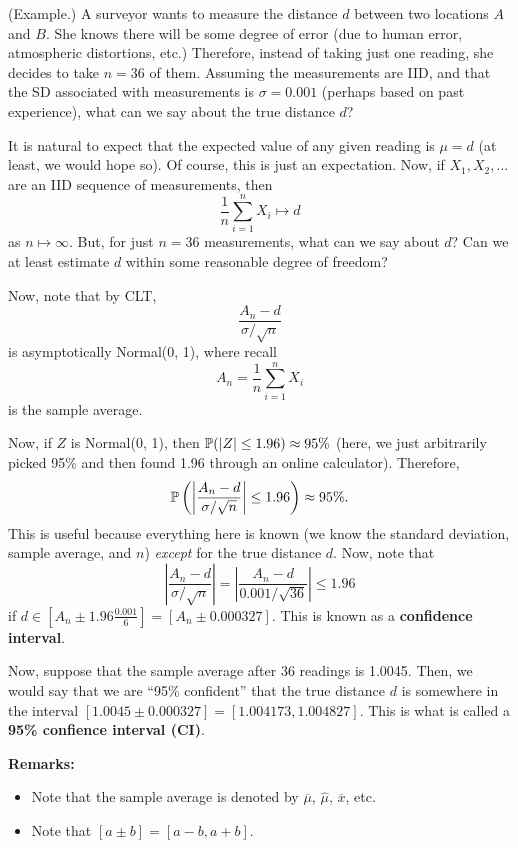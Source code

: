 \documentclass[letterpaper]{article}
\begin{document}
\begin{mdframed}[]
    (Example.) A surveyor wants to measure the distance $d$ between two locations $A$ and $B$. She knows there will be some degree of error (due to human error, atmospheric distortions, etc.) Therefore, instead of taking just one reading, she decides to take $n = 36$ of them. Assuming the measurements are IID, and that the SD associated with measurements is $\sigma = 0.001$ (perhaps based on past experience), what can we say about the true distance $d$? 

    \bigskip 

    It is natural to expect that the expected value of any given reading is $\mu = d$ (at least, we would hope so). Of course, this is just an expectation. Now, if $X_1, X_2, \dots$ are an IID sequence of measurements, then 
    \[\frac{1}{n} \sum_{i = 1}^{n} X_i \mapsto d\]
    as $n \mapsto \infty$. But, for just $n = 36$ measurements, what can we say about $d$? Can we at least estimate $d$ within some reasonable degree of freedom? 

    \bigskip 

    Now, note that by CLT, \[\frac{A_n - d}{\sigma / \sqrt{n}}\] is asymptotically Normal(0, 1), where recall \[A_n = \frac{1}{n}\sum_{i = 1}^{n} X_i\] is the sample average. 

    \bigskip 

    Now, if $Z$ is Normal(0, 1), then $\mathbb{P}(|Z| \leq 1.96) \approx 95\%$ (here, we just arbitrarily picked 95\% and then found 1.96 through an online calculator). Therefore, 
    \[\mathbb{P}\left(\left|\frac{A_n - d}{\sigma / \sqrt{n}}\right| \leq 1.96\right) \approx 95\%.\]
    This is useful because everything here is known (we know the standard deviation, sample average, and $n$) \emph{except} for the true distance $d$. Now, note that 
    \[\left|\frac{A_n - d}{\sigma / \sqrt{n}}\right| = \left|\frac{A_n - d}{0.001 / \sqrt{36}}\right| \leq 1.96\] 
    if $d \in \left[A_n \pm 1.96 \frac{0.001}{6}\right] = [A_n \pm 0.000327]$. This is known as a \textbf{confidence interval}. 

    \bigskip 

    Now, suppose that the sample average after 36 readings is 1.0045. Then, we would say that we are ``95\% confident'' that the true distance $d$ is somewhere in the interval $[1.0045 \pm 0.000327] = [1.004173, 1.004827]$. This is what is called a \textbf{95\% confience interval (CI)}.
\end{mdframed}
\textbf{Remarks:}
\begin{itemize}
    \item Note that the sample average is denoted by $\overline{\mu}$, $\hat{\mu}$, $\overline{x}$, etc.
    \item Note that $[a \pm b] = [a - b, a + b]$. 
\end{itemize}
\end{document}
